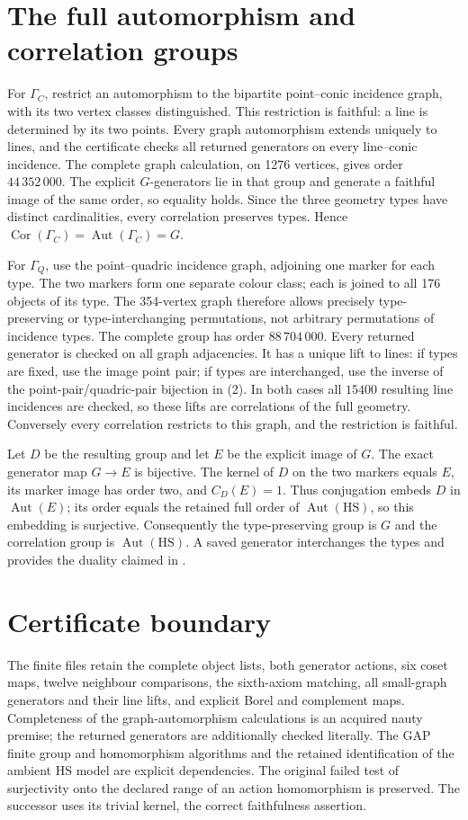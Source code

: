 \documentclass[11pt]{article}
\newcommand{\HS}{\mathrm{HS}}
\newcommand{\Aut}{\operatorname{Aut}}
\newcommand{\Cor}{\operatorname{Cor}}
\begin{document}
\section*{The full automorphism and correlation groups}
For $\Gamma_C$, restrict an automorphism to the bipartite point--conic
incidence graph, with its two vertex classes distinguished.  This
restriction is faithful: a line is determined by its two points.
Every graph automorphism extends uniquely to lines, and the certificate
checks all returned generators on every line--conic incidence.
The complete graph calculation, on 1276 vertices, gives order
$44\,352\,000$.  The explicit $G$-generators lie in that group and
generate a faithful image of the same order, so equality holds.  Since
the three geometry types have distinct cardinalities, every correlation
preserves types.  Hence $\Cor(\Gamma_C)=\Aut(\Gamma_C)=G$.

For $\Gamma_Q$, use the point--quadric incidence graph, adjoining one
marker for each type.  The two markers form one separate colour class;
each is joined to all 176 objects of its type.  The 354-vertex graph
therefore allows precisely type-preserving or type-interchanging
permutations, not arbitrary permutations of incidence types.
The complete group has order $88\,704\,000$.  Every returned generator
is checked on all graph adjacencies.  It has a unique lift to lines:
if types are fixed, use the image point pair; if types are interchanged,
use the inverse of the point-pair/quadric-pair bijection in (2).
In both cases all $15400$ resulting line incidences are checked, so these
lifts are correlations of the full geometry.  Conversely every
correlation restricts to this graph, and the restriction is faithful.

Let $D$ be the resulting group and let $E$ be the explicit image of $G$.
The exact generator map $G\to E$ is bijective.  The kernel of $D$ on
the two markers equals $E$, its marker image has order two, and
$C_D(E)=1$.  Thus conjugation embeds $D$ in $\Aut(E)$; its order equals
the retained full order of $\Aut(\HS)$, so this embedding is surjective.
Consequently the type-preserving group is $G$ and the correlation group
is $\Aut(\HS)$.  A saved generator interchanges the types and provides
the duality claimed in \cite[Section~4.2]{L}.

\section*{Certificate boundary}
The finite files retain the complete object lists, both generator
actions, six coset maps, twelve neighbour comparisons, the sixth-axiom
matching, all small-graph generators and their line lifts, and explicit
Borel and complement maps.  Completeness of the graph-automorphism
calculations is an acquired nauty premise; the returned generators are
additionally checked literally.  The GAP finite group and homomorphism
algorithms and the retained identification of the ambient $\HS$ model
are explicit dependencies.  The original failed test of surjectivity
onto the declared range of an action homomorphism is preserved.  The
successor uses its trivial kernel, the correct faithfulness assertion.
\end{document}

